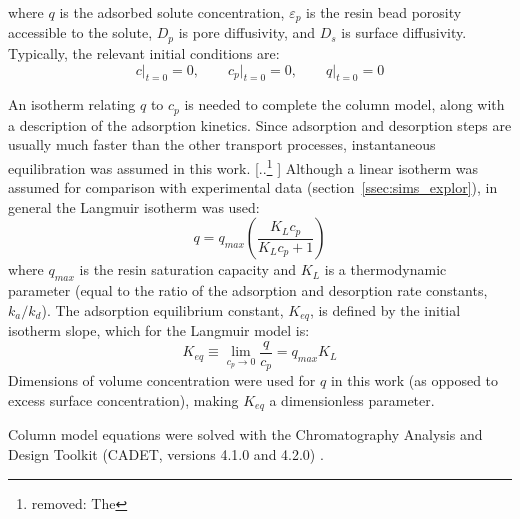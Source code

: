 \documentclass[preprint,review,12pt]{elsarticle}
\providecommand{\DIFaddtex}[1]{{\protect\color{blue} \sf #1}} %
\providecommand{\DIFdeltex}[1]{{\protect\color{red} [..\footnote{removed: #1} ]}} %
\providecommand{\DIFaddbegin}{} %
\providecommand{\DIFaddend}{} %
\providecommand{\DIFdelbegin}{} %
\providecommand{\DIFdelend}{} %
\providecommand{\DIFadd}[1]{\texorpdfstring{\DIFaddtex{#1}}{#1}} %
\providecommand{\DIFdel}[1]{\texorpdfstring{\DIFdeltex{#1}}{}} %
\begin{document}
        where $q$ is the adsorbed solute concentration, $\varepsilon_p$ is the resin bead porosity accessible to the solute, $D_p$ is pore diffusivity, and $D_s$ is surface diffusivity. Typically, the relevant initial conditions are:
        \begin{equation} \label{eq:ic}
            c\big|_{t=0} = 0, \qquad c_p\big|_{t=0} = 0, \qquad q\big|_{t=0} = 0
        \end{equation}

        An isotherm relating $q$ to $c_p$ is needed to complete the column model, along with a description of the adsorption kinetics. Since adsorption and desorption steps are usually much faster than the other transport processes, instantaneous equilibration was assumed in this work. \DIFdelbegin \DIFdel{The }\DIFdelend \DIFaddbegin \DIFadd{Although a linear isotherm was assumed for comparison with experimental data (section~\ref{ssec:sims_explor}), in general the }\DIFaddend Langmuir isotherm was used:
        \begin{equation} \label{eq:langmuir_ss}
            q = q_{max} \left( \frac{K_L c_p}{K_L c_p + 1} \right)
        \end{equation}
        where $q_{max}$ is the resin saturation capacity and $K_L$ is a thermodynamic parameter (equal to the ratio of the adsorption and desorption rate constants, $k_a/k_d$). The adsorption equilibrium constant, $K_{eq}$, is defined by the initial isotherm slope, which for the Langmuir model is:
        \begin{equation} \label{eq:langmuir_keq}
            K_{eq} \equiv \lim_{c_p \to 0} \frac{q}{c_p} = q_{max} K_L
        \end{equation}
        Dimensions of volume concentration were used for $q$ in this work (as opposed to excess surface concentration), making $K_{eq}$ a dimensionless parameter.

        Column model equations were solved with the Chromatography Analysis and Design Toolkit (CADET, versions 4.1.0 and 4.2.0) \cite{Leweke2018}.
\end{document}
